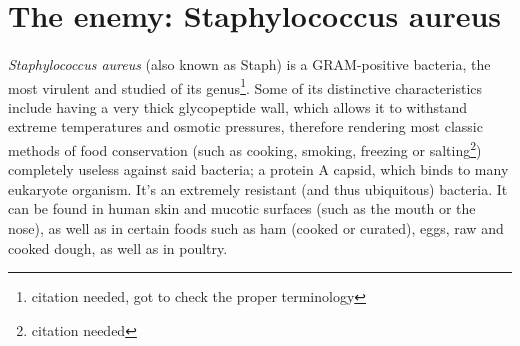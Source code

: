 \section{The enemy: Staphylococcus aureus}
\paragraph{}\emph{Staphylococcus aureus} (also known as Staph) is a GRAM-positive bacteria, the most virulent and studied of its genus\footnote{citation needed, got to check the proper terminology}. Some of its distinctive characteristics include having a very thick glycopeptide wall, which allows it to withstand extreme temperatures and osmotic pressures, therefore rendering most classic methods of food conservation (such as cooking, smoking, freezing or salting\footnote{citation needed}) completely useless against said bacteria;  a protein A capsid, which binds to many eukaryote organism. It's an extremely resistant (and thus ubiquitous) bacteria. It can be found in human skin and mucotic surfaces (such as the mouth or the nose), as well as in certain foods such as ham (cooked or curated), eggs, raw and cooked dough, as well as in poultry.
